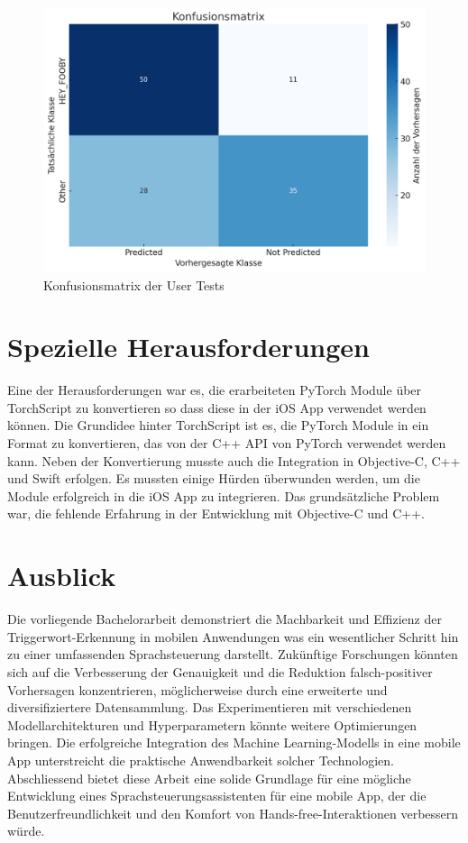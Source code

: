 \documentclass[11pt,a4paper]{article}
\begin{document}
\begin{figure}[H]
\centering
\includegraphics[width=.5\linewidth]{img/eval-usertests.png}
\caption{Konfusionsmatrix der User Tests}
\end{figure}


\section{Spezielle Herausforderungen}
Eine der Herausforderungen war es, die erarbeiteten PyTorch Module über TorchScript zu konvertieren so dass diese in der iOS App verwendet werden können. Die Grundidee hinter TorchScript ist es, die PyTorch Module in ein Format zu konvertieren, das von der C++ API von PyTorch verwendet werden kann. 
Neben der Konvertierung musste auch die Integration in Objective-C, C++ und Swift erfolgen. Es mussten einige Hürden überwunden werden, um die Module erfolgreich in die iOS App zu integrieren. Das grundsätzliche Problem war, die fehlende Erfahrung in der Entwicklung mit Objective-C und C++.

\section{Ausblick}
Die vorliegende Bachelorarbeit demonstriert die Machbarkeit und Effizienz der Triggerwort-Erkennung in mobilen Anwendungen was ein wesentlicher Schritt hin zu einer umfassenden Sprachsteuerung darstellt. Zukünftige Forschungen könnten sich auf die Verbesserung der Genauigkeit und die Reduktion falsch-positiver Vorhersagen konzentrieren, möglicherweise durch eine erweiterte und diversifiziertere Datensammlung. Das Experimentieren mit verschiedenen Modellarchitekturen und Hyperparametern könnte weitere Optimierungen bringen. Die erfolgreiche Integration des Machine Learning-Modells in eine mobile App unterstreicht die praktische Anwendbarkeit solcher Technologien. Abschliessend bietet diese Arbeit eine solide Grundlage für eine mögliche Entwicklung eines Sprachsteuerungsassistenten für eine mobile App, der die Benutzerfreundlichkeit und den Komfort von Hands-free-Interaktionen verbessern würde.
\end{document}
